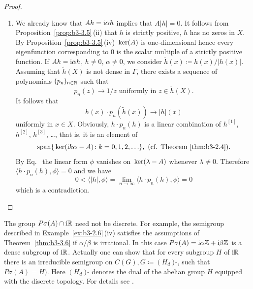 \begin{proof}
\begin{enumerate}[wide, labelindent=.25em]
	\item[(iii)] 
	We already know that $Ah = \mathrm{i}\alpha h$ implies that $A|h| = 0$.
	It follows from Proposition~\ref{prop:b3-3.5}\,(ii) that $h$ is strictly positive, \ie $h$ has no zeros in $X$.
	By Proposition~\ref{prop:b3-3.5}\,(iv) $\mathop{}\mathrm{ker}(A)$ is one-dimensional hence every
	eigenfunction corresponding to $0$ is the scalar multiple of a strictly positive function.
	If\/ $Ah = \mathrm{i}\alpha h$, $h \neq 0$, $\alpha \neq 0$, we consider $\tilde{h}(x) \coloneq h(x)/|h(x)|$.
	Assuming that $\tilde{h}(X)$ is not dense in $\Gamma$, there exists a sequence of polynomials $(p_{n})_{n\in\mathbb{N}}$ such that
	\begin{equation}\label{eq:b3-3.8}
		p_{n}(z) \to 1/z \text{ uniformly in } z \in \tilde{h}(X).
	\end{equation}
	It follows that 
    \[%
    h(x)\cdot p_{n}(\tilde{h}(x)) \to |h|(x)
    \]
    uniformly in $x \in X$.
	Obviously, $h\cdot p_{n}(h)$ is a linear combination of\/ $h^{[1]}$, $h^{[2]}$, $h^{[3]}$, \ldots, that is, it is an element of
	\[
	\text{span$\{\Kern{ \im k\alpha - A} \colon  k=0,1,2,\ldots \}$}, \  \text{(\cf Theorem~\ref{thm:b3-2.4})}.
	\]
	By Eq.~ the linear form $\phi$ vanishes on $\mathop{}\mathrm{ker}(\lambda - A)$ whenever $\lambda \neq 0$.
	Therefore $\langle h\cdot p_{n}(h),\phi\rangle = 0$ and we have 
    \[
    0 < \langle|h|,\phi\rangle = \lim_{n\to\infty}\langle h\cdot p_{n}(h),\phi\rangle = 0
    \]
    which is a contradiction.
    \qedhere
	\end{enumerate}
\end{proof}
The group $P\sigma(A) \cap \mathrm{i}\mathbb{R}$ need not be discrete. 
For example, the semigroup described in Example~\ref{ex:b3-2.6}\,(iv) satisfies the assumptions of Theorem~\ref{thm:b3-3.6} if\/ ${\alpha}/{\beta}$ is irrational. 
In this case $P\sigma(A) = \mathrm{i}\alpha \mathbb{Z} + \mathrm{i}\beta \mathbb{Z}$ is a dense subgroup of\/ $\mathrm{i} \mathbb{R}$. 
Actually one can show that for every subgroup $H$ of\/ $\mathrm{i} \mathbb{R}$ there is an irreducible semigroup on $C(G), G \coloneq (H_d)\,{\tilde{ }}$, such that $P\sigma(A) = H)$. 
Here $(H_d)\,{\tilde{ }}$ denotes the dual of the abelian group $H$ equipped with the discrete topology. 
For details see \textcite[p.62]{greiner:1982}. 

